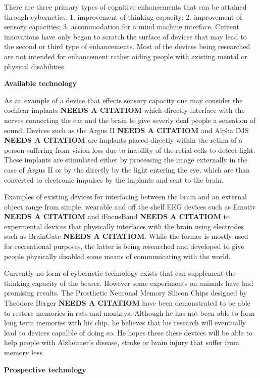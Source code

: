 There are three primary types of cognitive enhancements that can be attained through cybernetics. 1. improvement of thinking capacity; 2. improvement of sensory capacities; 3. accommodation for a mind machine interface. Current innovations have only began to scratch the surface of devices that may lead to the second or third type of enhancements. Most of the devices being researched are not intended for enhancement rather aiding people with existing mental or physical disabilities. 

{\bf Available technology}

As an example of a device that effects sensory capacity one may consider the cochlear implants {\bf NEEDS A CITATIOM} which directly interface with the nerves connecting the ear and the brain to give severly deaf people a sensation of sound. Devices such as the Argus II {\bf NEEDS A CITATIOM} and Alpha IMS {\bf NEEDS A CITATIOM} are implants placed directly within the retina of a person suffering from vision loss due to inability of the retial cells to detect light. These implants are stimulated either by processing the image externally in the case of Argus II or by the directly by the light entering the eye, which are than converted to electronic impulses by the implants and sent to the brain. 

Examples of existing devices for interfacing between the brain and an external object range from simple, wearable and off the shelf EEG devices such as Emotiv {\bf NEEDS A CITATIOM} and iFocusBand {\bf NEEDS A CITATIOM} to expermental devices that physically interfaces with the brain using electrodes such as BrainGate {\bf NEEDS A CITATIOM}. While the former is mostly used for recreational purposes, the latter is being researched and developed to give people physically disabled some means of communicating with the world.

Currently no form of cybernetic technology exists that can supplement the thinking capacity of the bearer. However some experiments on animals have had promising results. The Prosthetic Neuronal Memory Silicon Chips designed by Theodore Berger {\bf NEEDS A CITATIOM} have been demonstrated to be able to restore memories in rats and monkeys. Although he has not been able to form long term memories with his chip, he believes that his research will eventually lead to devices capalble of doing so. He hopes these these devices will be able to help people with Alzheimer's disease, stroke or brain injury that suffer from memory loss.


{\bf Prospective technology}

